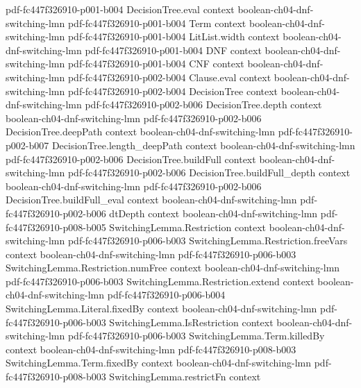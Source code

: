 \begin{theorem}
  {pdf-fc447f326910-p001-b004}
\proofstep
  {DecisionTree.eval}
  {context}
  {boolean-ch04-dnf-switching-lmn}
  {pdf-fc447f326910-p001-b004}
\proofstep
  {Term}
  {context}
  {boolean-ch04-dnf-switching-lmn}
  {pdf-fc447f326910-p001-b004}
\proofstep
  {LitList.width}
  {context}
  {boolean-ch04-dnf-switching-lmn}
  {pdf-fc447f326910-p001-b004}
\proofstep
  {DNF}
  {context}
  {boolean-ch04-dnf-switching-lmn}
  {pdf-fc447f326910-p001-b004}
\proofstep
  {CNF}
  {context}
  {boolean-ch04-dnf-switching-lmn}
  {pdf-fc447f326910-p002-b004}
\proofstep
  {Clause.eval}
  {context}
  {boolean-ch04-dnf-switching-lmn}
  {pdf-fc447f326910-p002-b004}
\proofstep
  {DecisionTree}
  {context}
  {boolean-ch04-dnf-switching-lmn}
  {pdf-fc447f326910-p002-b006}
\proofstep
  {DecisionTree.depth}
  {context}
  {boolean-ch04-dnf-switching-lmn}
  {pdf-fc447f326910-p002-b006}
\proofstep
  {DecisionTree.deepPath}
  {context}
  {boolean-ch04-dnf-switching-lmn}
  {pdf-fc447f326910-p002-b007}
\proofstep
  {DecisionTree.length_deepPath}
  {context}
  {boolean-ch04-dnf-switching-lmn}
  {pdf-fc447f326910-p002-b006}
\proofstep
  {DecisionTree.buildFull}
  {context}
  {boolean-ch04-dnf-switching-lmn}
  {pdf-fc447f326910-p002-b006}
\proofstep
  {DecisionTree.buildFull_depth}
  {context}
  {boolean-ch04-dnf-switching-lmn}
  {pdf-fc447f326910-p002-b006}
\proofstep
  {DecisionTree.buildFull_eval}
  {context}
  {boolean-ch04-dnf-switching-lmn}
  {pdf-fc447f326910-p002-b006}
\proofstep
  {dtDepth}
  {context}
  {boolean-ch04-dnf-switching-lmn}
  {pdf-fc447f326910-p008-b005}
\proofstep
  {SwitchingLemma.Restriction}
  {context}
  {boolean-ch04-dnf-switching-lmn}
  {pdf-fc447f326910-p006-b003}
\proofstep
  {SwitchingLemma.Restriction.freeVars}
  {context}
  {boolean-ch04-dnf-switching-lmn}
  {pdf-fc447f326910-p006-b003}
\proofstep
  {SwitchingLemma.Restriction.numFree}
  {context}
  {boolean-ch04-dnf-switching-lmn}
  {pdf-fc447f326910-p006-b003}
\proofstep
  {SwitchingLemma.Restriction.extend}
  {context}
  {boolean-ch04-dnf-switching-lmn}
  {pdf-fc447f326910-p006-b004}
\proofstep
  {SwitchingLemma.Literal.fixedBy}
  {context}
  {boolean-ch04-dnf-switching-lmn}
  {pdf-fc447f326910-p006-b003}
\proofstep
  {SwitchingLemma.IsRestriction}
  {context}
  {boolean-ch04-dnf-switching-lmn}
  {pdf-fc447f326910-p006-b003}
\proofstep
  {SwitchingLemma.Term.killedBy}
  {context}
  {boolean-ch04-dnf-switching-lmn}
  {pdf-fc447f326910-p008-b003}
\proofstep
  {SwitchingLemma.Term.fixedBy}
  {context}
  {boolean-ch04-dnf-switching-lmn}
  {pdf-fc447f326910-p008-b003}
\proofstep
  {SwitchingLemma.restrictFn}
  {context}

\end{theorem}
